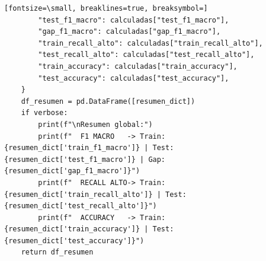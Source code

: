 \documentclass[12pt,a4paper,oneside]{book}
\begin{document}
\begin{iaprompt}
\begin{Verbatim}[fontsize=\small, breaklines=true, breaksymbol=]
        "test_f1_macro": calculadas["test_f1_macro"],
        "gap_f1_macro": calculadas["gap_f1_macro"],
        "train_recall_alto": calculadas["train_recall_alto"],
        "test_recall_alto": calculadas["test_recall_alto"],
        "train_accuracy": calculadas["train_accuracy"],
        "test_accuracy": calculadas["test_accuracy"],
    }
    df_resumen = pd.DataFrame([resumen_dict])
    if verbose:
        print(f"\nResumen global:")
        print(f"  F1 MACRO   -> Train: {resumen_dict['train_f1_macro']} | Test: {resumen_dict['test_f1_macro']} | Gap: {resumen_dict['gap_f1_macro']}")
        print(f"  RECALL ALTO-> Train: {resumen_dict['train_recall_alto']} | Test: {resumen_dict['test_recall_alto']}")
        print(f"  ACCURACY   -> Train: {resumen_dict['train_accuracy']} | Test: {resumen_dict['test_accuracy']}")
    return df_resumen
\end{Verbatim}
\end{iaprompt}
\end{document}
